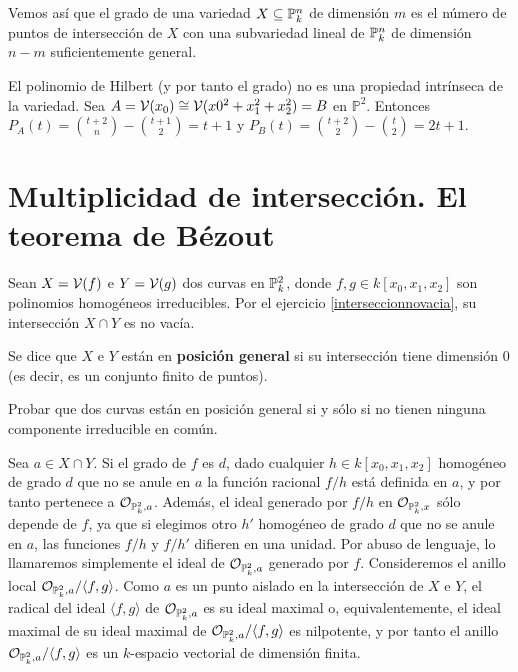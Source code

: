 \documentclass[ACGA.tex]{subfiles}
\begin{document}
Vemos así que el grado de una variedad $X\subseteq\mathbb{P}^n_k$ de dimensión $m$ es el número de puntos de intersección de $X$ con una subvariedad lineal de $\mathbb{P}^n_k$ de dimensión $n-m$ suficientemente general. 

\begin{ejs}
El polinomio de Hilbert (y por tanto el grado) no es una propiedad intrínseca de la variedad. Sea $A=\mathcal{V}(x_0)\cong \mathcal{V}(x0^2+x_1^2+x_2^2)=B$ en $\mathbb{P}^2$. Entonces $P_A(t)=\binom{t+2}{n}-\binom{t+1}{2}=t+1$ y $P_B(t)=\binom{t+2}{2}-\binom{t}{2}=2t+1$. 
\end{ejs}

\section[Multiplicidad de intersección]{Multiplicidad de intersección. El teorema de Bézout}

                                                                                                                                                                                                                                                                                                                                                                                        Sean $X=\mathcal{V}(f)$ e $Y=\mathcal{V}(g)$ dos curvas en $\mathbb{P}^2_k$, donde $f,g\in k[x_0,x_1,x_2]$ son polinomios homogéneos irreducibles. Por el ejercicio \ref{interseccionnovacia}, su intersección $X\cap Y$ es no vacía. 

\begin{defi}
 Se dice que $X$ e $Y$ están en {\bf posición general} si su intersección tiene dimensión $0$ (es decir, es un conjunto finito de puntos).
\end{defi}

\begin{ejer}
 Probar que dos curvas están en posición general si y sólo si no tienen ninguna componente irreducible en común.
\end{ejer}

Sea $a\in X\cap Y$. Si el grado de $f$ es $d$, dado cualquier $h\in k[x_0,x_1,x_2]$ homogéneo de grado $d$ que no se anule en $a$ la función racional $f/h$ está definida en $a$, y por tanto pertenece a ${\mathcal O}_{\mathbb{P}^2_k,a}$. Además, el ideal generado por $f/h$ en ${\mathcal O}_{\mathbb{P}^2_k,x}$ sólo depende de $f$, ya que si elegimos otro $h'$ homogéneo de grado $d$ que no se anule en $a$, las funciones ${f}/{h}$ y ${f}/{h'}$ difieren en una unidad. Por abuso de lenguaje, lo llamaremos simplemente el ideal de ${\mathcal O}_{\mathbb{P}^2_k,a}$ generado por $f$. Consideremos el anillo local ${\mathcal O}_{\mathbb{P}^2_k,a}/\langle f,g\rangle$. Como $a$ es un punto aislado en la intersección de $X$ e $Y$, el radical del ideal $\langle f,g\rangle$ de ${\mathcal O}_{\mathbb{P}^2_k,a}$ es su ideal maximal o, equivalentemente, el ideal maximal de  su ideal maximal de ${\mathcal O}_{\mathbb{P}^2_k,a}/\langle f,g\rangle$ es nilpotente, y por tanto el anillo ${\mathcal O}_{\mathbb{P}^2_k,a}/\langle f,g\rangle$ es un $k$-espacio vectorial de dimensión finita. 
\end{document}
